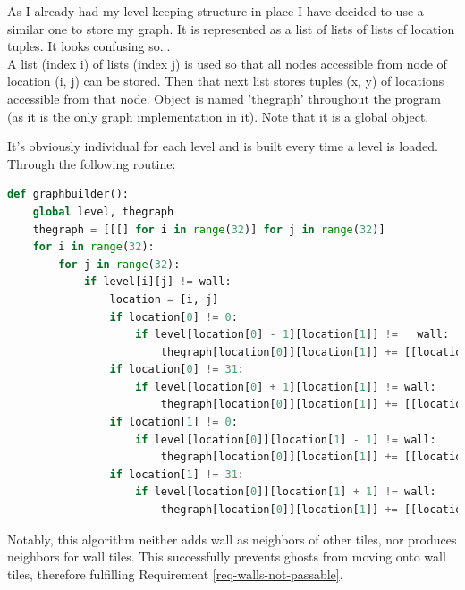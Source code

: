\documentclass[11pt,a4paper,notitlepage]{report}
\begin{document}
					As I already had my level-keeping structure in place I have decided to use a similar one to store my graph. It is represented as a list of lists of lists of location tuples. It looks confusing so...\\
					A list (index i) of lists (index j) is used so that all nodes accessible from node of location (i, j) can be stored. Then that next list stores tuples (x, y) of locations accessible from that node.
					Object is named 'thegraph' throughout the program (as it is the only graph implementation in it). Note that it is a global object.
					
					It's obviously individual for each level and is built every time a level is loaded. Through the following routine:
					\begin{lstlisting}[language=Python]
def graphbuilder():
	global level, thegraph
	thegraph = [[[] for i in range(32)] for j in range(32)]
	for i in range(32):
		for j in range(32):
			if level[i][j] != wall:
				location = [i, j]
				if location[0] != 0:
					if level[location[0] - 1][location[1]] != 	wall:
						thegraph[location[0]][location[1]] += [[location[0] - 1, location[1]]]
				if location[0] != 31:
					if level[location[0] + 1][location[1]] != wall:
						thegraph[location[0]][location[1]] += [[location[0] + 1, location[1]]]
				if location[1] != 0:
					if level[location[0]][location[1] - 1] != wall:
						thegraph[location[0]][location[1]] += [[location[0], location[1] - 1]]
				if location[1] != 31:
					if level[location[0]][location[1] + 1] != wall:
						thegraph[location[0]][location[1]] += [[location[0], location[1] + 1]]
					\end{lstlisting}
					Notably, this algorithm neither adds wall as neighbors of other tiles, nor produces neighbors for wall tiles. This successfully prevents ghosts from moving onto wall tiles, therefore fulfilling Requirement \ref{req-walls-not-passable}. 
\end{document}
